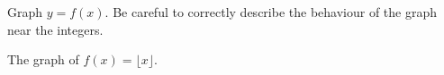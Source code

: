 {Graph $y = f(x)$.  Be careful to correctly describe the behaviour of the graph near the integers.}
{\begin{center}

The graph of $f(x) = \lfloor x \rfloor$.
\end{center}}